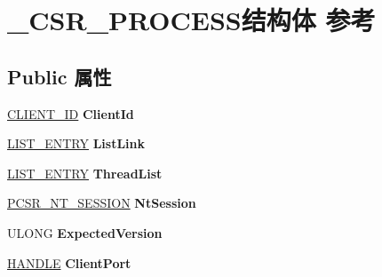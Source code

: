 \hypertarget{struct___c_s_r___p_r_o_c_e_s_s}{}\section{\+\_\+\+C\+S\+R\+\_\+\+P\+R\+O\+C\+E\+S\+S结构体 参考}
\label{struct___c_s_r___p_r_o_c_e_s_s}
\subsection*{Public 属性}
\begin{DoxyCompactItemize}
\item 
\mbox{\label{struct___c_s_r___p_r_o_c_e_s_s_a1db9f510475c545794357c66a840bd99}} 
\hyperlink{struct___c_l_i_e_n_t___i_d}{C\+L\+I\+E\+N\+T\+\_\+\+ID} {\bfseries Client\+Id}
\item 
\mbox{\label{struct___c_s_r___p_r_o_c_e_s_s_aa57d70273ea5181a989b3254897815b6}} 
\hyperlink{struct___l_i_s_t___e_n_t_r_y}{L\+I\+S\+T\+\_\+\+E\+N\+T\+RY} {\bfseries List\+Link}
\item 
\mbox{\label{struct___c_s_r___p_r_o_c_e_s_s_a297bfa0bb72e610f56eee9be99a7ef55}} 
\hyperlink{struct___l_i_s_t___e_n_t_r_y}{L\+I\+S\+T\+\_\+\+E\+N\+T\+RY} {\bfseries Thread\+List}
\item 
\mbox{\label{struct___c_s_r___p_r_o_c_e_s_s_a4c730bd5217a841272d770b561e6e0e6}} 
\hyperlink{struct___c_s_r___n_t___s_e_s_s_i_o_n}{P\+C\+S\+R\+\_\+\+N\+T\+\_\+\+S\+E\+S\+S\+I\+ON} {\bfseries Nt\+Session}
\item 
\mbox{\label{struct___c_s_r___p_r_o_c_e_s_s_a53a655aac6b31a077ff41be9e742ff77}} 
U\+L\+O\+NG {\bfseries Expected\+Version}
\item 
\mbox{\label{struct___c_s_r___p_r_o_c_e_s_s_abfa4b756fa4e46f9b42d06195a8758bd}} 
\hyperlink{interfacevoid}{H\+A\+N\+D\+LE} {\bfseries Client\+Port}
\item 
\mbox{\label{struct___c_s_r___p_r_o_c_e_s_s_aa95bcf793ff23ccd86c8ac42a50cd08b}} 

\end{DoxyCompactItemize}
